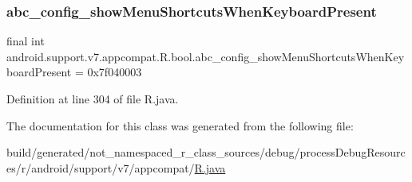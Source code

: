 \subsubsection{\texorpdfstring{abc\_config\_showMenuShortcutsWhenKeyboardPresent}{abc\_config\_showMenuShortcutsWhenKeyboardPresent}}
{\footnotesize\ttfamily final int android.\+support.\+v7.\+appcompat.\+R.\+bool.\+abc\+\_\+config\+\_\+show\+Menu\+Shortcuts\+When\+Keyboard\+Present = 0x7f040003\hspace{0.3cm}{\ttfamily [static]}}



Definition at line 304 of file R.\+java.



The documentation for this class was generated from the following file\+:\begin{DoxyCompactItemize}
\item 
build/generated/not\+\_\+namespaced\+\_\+r\+\_\+class\+\_\+sources/debug/process\+Debug\+Resources/r/android/support/v7/appcompat/\mbox{\hyperlink{android_2support_2v7_2appcompat_2_r_8java}{R.\+java}}\end{DoxyCompactItemize}
